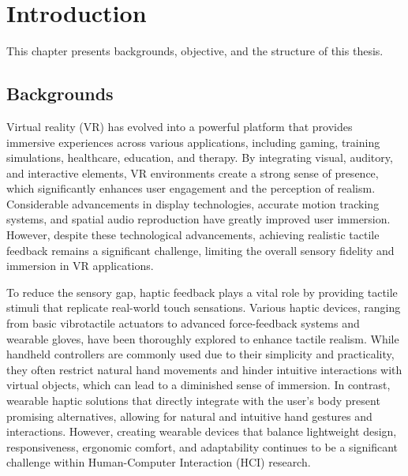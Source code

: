 
\chapter{Introduction} %

\label{Chapter1} %


\newcommand{\keyword}[1]{\textbf{#1}}
\newcommand{\tabhead}[1]{\textbf{#1}}
\newcommand{\code}[1]{\texttt{#1}}
\newcommand{\file}[1]{\texttt{\bfseries#1}}
\newcommand{\option}[1]{\texttt{\itshape#1}}

This chapter presents backgrounds, objective, and the structure of this thesis.

\section{Backgrounds}
Virtual reality (VR) has evolved into a powerful platform that provides immersive experiences across various applications, including gaming, training simulations, healthcare, education, and therapy\cite{10.3389/frobt.2016.00074}. By integrating visual, auditory, and interactive elements, VR environments create a strong sense of presence, which significantly enhances user engagement and the perception of realism\cite{10.5555/207922}. Considerable advancements in display technologies, accurate motion tracking systems, and spatial audio reproduction have greatly improved user immersion. However, despite these technological advancements, achieving realistic tactile feedback remains a significant challenge, limiting the overall sensory fidelity and immersion in VR applications\cite{10.1146/annurev-control-060117-105043}.

To reduce the sensory gap, haptic feedback plays a vital role by providing tactile stimuli that replicate real-world touch sensations\cite{10.1146/annurev-control-060117-105043}. Various haptic devices, ranging from basic vibrotactile actuators to advanced force-feedback systems and wearable gloves, have been thoroughly explored to enhance tactile realism. While handheld controllers are commonly used due to their simplicity and practicality, they often restrict natural hand movements and hinder intuitive interactions with virtual objects, which can lead to a diminished sense of immersion. In contrast, wearable haptic solutions that directly integrate with the user's body present promising alternatives, allowing for natural and intuitive hand gestures and interactions\cite{7922602}. However, creating wearable devices that balance lightweight design, responsiveness, ergonomic comfort, and adaptability continues to be a significant challenge within Human-Computer Interaction (HCI) research.

